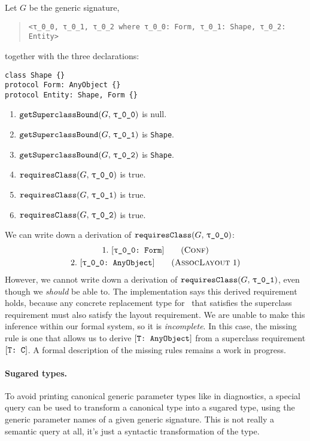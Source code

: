 \documentclass[../generics]{subfiles}
\begin{document}
\begin{example}
Let $G$ be the generic signature,
\begin{quote}
\begin{verbatim}
<τ_0_0, τ_0_1, τ_0_2 where τ_0_0: Form, τ_0_1: Shape, τ_0_2: Entity>
\end{verbatim}
\end{quote}
together with the three declarations:
\begin{Verbatim}
class Shape {}
protocol Form: AnyObject {}
protocol Entity: Shape, Form {}
\end{Verbatim}

\begin{enumerate}
\item $\Query{getSuperclassBound}{G,\,\texttt{\rT}}$ is null.
\item $\Query{getSuperclassBound}{G,\,\texttt{\rU}}$ is \texttt{Shape}.
\item $\Query{getSuperclassBound}{G,\,\texttt{\rV}}$ is \texttt{Shape}.
\item $\Query{requiresClass}{G,\,\texttt{\rT}}$ is true.
\item $\Query{requiresClass}{G,\,\texttt{\rU}}$ is true.
\item $\Query{requiresClass}{G,\,\texttt{\rV}}$ is true.
\end{enumerate}
We can write down a derivation of $\Query{requiresClass}{G,\,\texttt{\rT}}$:
\begin{gather*}
\ConfStep{\rT}{Form}{1}\\
\AssocLayoutStep{1}{\rT}{2}
\end{gather*}
However, we cannot write down a derivation of $\Query{requiresClass}{G,\,\texttt{\rU}}$, even though we \emph{should} be able to. The implementation says this derived requirement holds, because any concrete replacement type for \rU\ that satisfies the superclass requirement must also satisfy the layout requirement. We are unable to make this inference within our formal system, so it is \emph{incomplete}. In this case, the missing rule is one that allows us to derive $[\texttt{T:~AnyObject}]$ from a superclass requirement $[\texttt{T:~C}]$. A formal description of the missing rules remains a work in progress.
\end{example}

\paragraph{Sugared types.} To avoid printing canonical generic parameter types like  in diagnostics, a special query can be used to transform a canonical type into a sugared type, using the generic parameter names of a given generic signature. This is not really a semantic query at all, it's just a syntactic transformation of the type.
\end{document}
